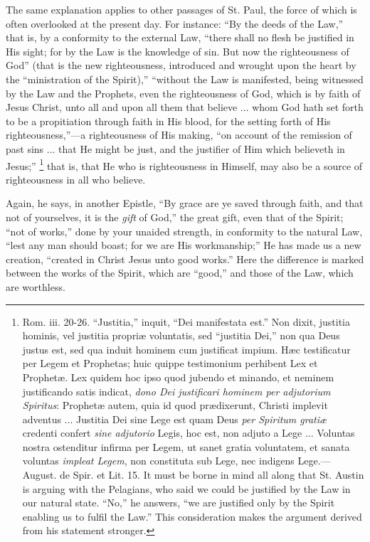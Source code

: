 The same explanation applies to other passages of St. Paul, the
force of which is often overlooked at the present day. For instance:
``By the deeds of the Law,'' that is, by a conformity to the
external Law, ``there shall no flesh be justified in His sight;
for by the Law is the knowledge of sin. But now the righteousness of
God'' (that is the new righteousness, introduced and wrought upon
the heart by the ``ministration of the Spirit),''
``without the Law is manifested, being witnessed by the Law and
the Prophets, even the righteousness of God, which is by faith of
Jesus Christ, unto all and upon all them that believe ... whom God
hath set forth to be a propitiation through faith in His blood, for
the setting forth of His righteousness,''—a righteousness of His
making, ``on account of the remission of past sins ... that He
might be just, and the justifier of Him which believeth in
Jesus;'' \footnote{Rom. iii.
20-26. ``Justitia,'' inquit, ``Dei manifestata est.''
Non dixit, justitia hominis, vel justitia propriæ voluntatis, sed
``justitia Dei,'' non qua Deus justus est, sed qua induit
hominem cum justificat impium. Hæc testificatur per Legem et
Prophetas; huic quippe testimonium perhibent Lex et Prophetæ. Lex
quidem hoc ipso quod jubendo et minando, et neminem justificando satis
indicat, \emph{dono Dei justificari hominem per adjutorium Spiritus}:
Prophetæ autem, quia id quod prædixerunt, Christi implevit adventus
... Justitia Dei sine Lege est quam Deus \emph{per Spiritum gratiæ} credenti
confert \emph{sine adjutorio} Legis, hoc est, non adjuto a Lege ... Voluntas
nostra ostenditur infirma per Legem, ut sanet gratia voluntatem, et
sanata voluntas \emph{impleat Legem}, non constituta sub Lege, nec indigens
Lege.—August. de Spir. et Lit. 15. It must be borne in mind all
along that St. Austin is arguing with the Pelagians, who said we could
be justified by the Law in our natural state. ``No,'' he
answers, ``we are justified only by the Spirit enabling us to
fulfil the Law.'' This consideration makes the argument derived
from his statement stronger.} that is,
that He who is righteousness in Himself, may also be a source of
righteousness in all who believe.

Again, he says, in another Epistle, ``By grace are ye saved
through faith, and that not of yourselves, it is the \emph{gift} of
God,'' the great gift, even that of the Spirit; ``not of
works,'' done by your unaided strength, in conformity to the
natural Law, ``lest any man should boast; for we are His
workmanship;'' He has made us a new creation, ``created in
Christ Jesus unto good works.'' Here the difference is marked
between the works of the Spirit, which are ``good,'' and those
of the Law, which are worthless.

